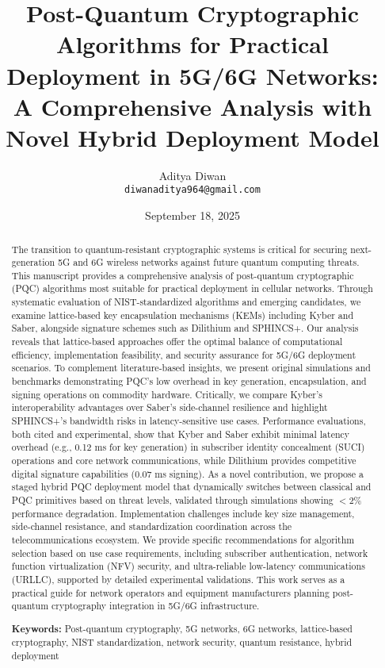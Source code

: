 \documentclass[11pt,a4paper]{article}
\title{Post-Quantum Cryptographic Algorithms for Practical Deployment in 5G/6G Networks: A Comprehensive Analysis with Novel Hybrid Deployment Model}
\author{Aditya Diwan\\
\texttt{diwanaditya964@gmail.com}}
\date{September 18, 2025}
\begin{document}
\maketitle

\begin{abstract}
The transition to quantum-resistant cryptographic systems is critical for securing next-generation 5G and 6G wireless networks against future quantum computing threats. This manuscript provides a comprehensive analysis of post-quantum cryptographic (PQC) algorithms most suitable for practical deployment in cellular networks. Through systematic evaluation of NIST-standardized algorithms and emerging candidates, we examine lattice-based key encapsulation mechanisms (KEMs) including Kyber and Saber, alongside signature schemes such as Dilithium and SPHINCS+. Our analysis reveals that lattice-based approaches offer the optimal balance of computational efficiency, implementation feasibility, and security assurance for 5G/6G deployment scenarios. To complement literature-based insights, we present original simulations and benchmarks demonstrating PQC's low overhead in key generation, encapsulation, and signing operations on commodity hardware. Critically, we compare Kyber's interoperability advantages over Saber's side-channel resilience and highlight SPHINCS+'s bandwidth risks in latency-sensitive use cases. Performance evaluations, both cited and experimental, show that Kyber and Saber exhibit minimal latency overhead (e.g., 0.12 ms for key generation) in subscriber identity concealment (SUCI) operations and core network communications, while Dilithium provides competitive digital signature capabilities (0.07 ms signing). As a novel contribution, we propose a staged hybrid PQC deployment model that dynamically switches between classical and PQC primitives based on threat levels, validated through simulations showing $<$2\% performance degradation. Implementation challenges include key size management, side-channel resistance, and standardization coordination across the telecommunications ecosystem. We provide specific recommendations for algorithm selection based on use case requirements, including subscriber authentication, network function virtualization (NFV) security, and ultra-reliable low-latency communications (URLLC), supported by detailed experimental validations. This work serves as a practical guide for network operators and equipment manufacturers planning post-quantum cryptography integration in 5G/6G infrastructure.

\textbf{Keywords:} Post-quantum cryptography, 5G networks, 6G networks, lattice-based cryptography, NIST standardization, network security, quantum resistance, hybrid deployment
\end{abstract}
\end{document}
